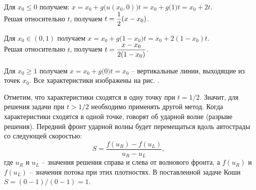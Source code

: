 Для \( x_0 \le 0 \) получаем:
\( x = x_0 + g\bigl(u(x_0, 0)\bigr)t = x_0 + g\bigl(1\bigr)t = x_0 + 2t \).\\
Решая относительно \( t \), получаем \( \displaystyle t = \frac{1}{2}(x - x_0) \).

Для \( x_0 \in (0, 1) \) получаем
\( x = x_0 + g\bigl(1-x_0\bigr)t = x_0 + 2(1-x_0)t \).\\
Решая относительно \( t \), получаем \( \displaystyle t = \frac{x-x_0}{2(1 - x_0)} \).

Для \( x_0 \ge 1 \) получаем \( x = x_0 + g\bigl(0\bigr)t = x_0 \) --
вертикальные линии, выходящие из точек \( x_0 \). Все характеристики изображены
на рис. \smiley.

Отметим, что характеристики сходятся в одну точку при \( t = 1/2 \). Значит, для
решения задачи при \( t > 1/2 \) необходимо применять другой метод. Когда
характеристики сходятся в одной точке, говорят об ударной волне (разрыве
решения). Передний фронт ударной волны будет перемещаться вдоль автострады со
следующей скоростью:
\[
    S = \frac{f(u_R) - f(u_L)}{u_R - u_L},
\]
где \( u_R \) и \( u_L \) -- значения решения справа и слева от волнового
фронта, а \( f(u_R) \) и \( f(u_L) \) -- значения потока при этих плотностях. В
поставленной задаче Коши \( S = (0 - 1)/(0 - 1) = 1 \).

\newpage
